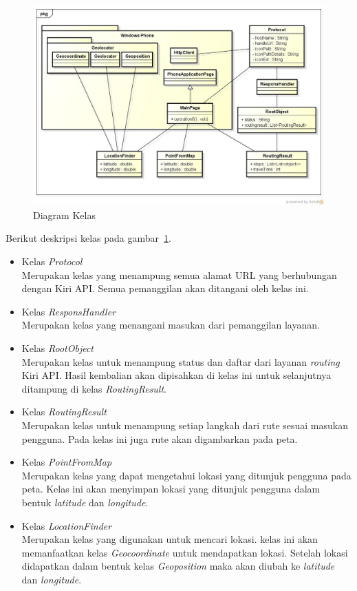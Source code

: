 \begin{figure}[h]
	\centering
		\includegraphics[scale=0.4]{Gambar/useCase_dan_Class/class}
	\caption{Diagram Kelas}
	\label{fig:kelas}
\end{figure}

Berikut deskripsi kelas pada gambar~\ref{fig:kelas}.
\begin{itemize}
	\item Kelas \textit{Protocol} \\
	Merupakan kelas yang menampung semua alamat URL yang berhubungan dengan Kiri API. Semua pemanggilan akan ditangani oleh kelas ini.
	\item Kelas \textit{ResponsHandler} \\
	Merupakan kelas yang menangani masukan dari pemanggilan layanan.
	\item Kelas \textit{RootObject} \\
	Merupakan kelas untuk menampung status dan daftar dari layanan \textit{routing} Kiri API. Hasil kembalian akan dipisahkan di kelas ini untuk selanjutnya ditampung di kelas \textit{RoutingResult}. 
	\item Kelas \textit{RoutingResult} \\
	Merupakan kelas untuk menampung setiap langkah dari rute sesuai masukan pengguna. Pada kelas ini juga rute akan digambarkan pada peta.
	\item Kelas \textit{PointFromMap} \\
	Merupakan kelas yang dapat mengetahui lokasi yang ditunjuk pengguna pada peta. Kelas ini akan menyimpan lokasi yang ditunjuk pengguna dalam bentuk \textit{latitude} dan \textit{longitude}.
	\item Kelas \textit{LocationFinder} \\
	Merupakan kelas yang digunakan untuk mencari lokasi. kelas ini akan memanfaatkan kelas \textit{Geocoordinate} untuk mendapatkan lokasi. Setelah lokasi didapatkan dalam bentuk kelas \textit{Geoposition} maka akan diubah ke \textit{latitude} dan \textit{longitude}. 
\end{itemize}